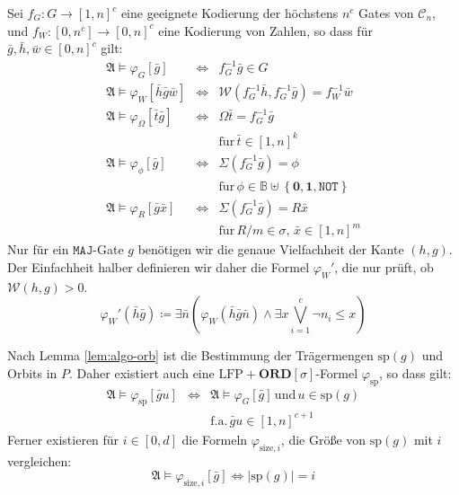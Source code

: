 Sei $f_{G}:G\rightarrow\left[1,n\right]^{c}$ eine geeignete Kodierung
der höchstens $n^{c}$ Gates von $\mathcal{C}_{n}$, und $f_{W}:\left[0,n^{c}\right]\rightarrow\left[0,n\right]^{c}$
eine Kodierung von Zahlen, so dass für $\bar{g},\bar{h},\bar{w}\in\left[0,n\right]^{c}$
gilt:
\begin{eqnarray*}
\mathfrak{A}\models\varphi_{G}\left[\bar{g}\right] & \Leftrightarrow & f_{G}^{-1}\bar{g}\in G\\
\mathfrak{A}\models\varphi_{W}\left[\bar{h}\bar{g}\bar{w}\right] & \Leftrightarrow & \mathcal{W}\left(f_{G}^{-1}\bar{h},f_{G}^{-1}\bar{g}\right)=f_{W}^{-1}\bar{w}\\
\mathfrak{A}\models\varphi_{\Omega}\left[\bar{t}\bar{g}\right] & \Leftrightarrow & \Omega\bar{t}=f_{G}^{-1}\bar{g}\\
 &  & \mathrm{f\ddot{u}r}\,\bar{t}\in\left[1,n\right]^{k}\\
\mathfrak{A}\models\varphi_{\phi}\left[\bar{g}\right] & \Leftrightarrow & \Sigma\left(f_{G}^{-1}\bar{g}\right)=\phi\\
 &  & \mathrm{f\ddot{u}r}\,\phi\in\mathbb{B}\uplus\left\{ \mathbf{0},\mathbf{1},\mathtt{NOT}\right\} \\
\mathfrak{A}\models\varphi_{R}\left[\bar{g}\bar{x}\right] & \Leftrightarrow & \Sigma\left(f_{G}^{-1}\bar{g}\right)=R\bar{x}\\
 &  & \mathrm{f\ddot{u}r}\,R/m\in\sigma,\,\bar{x}\in\left[1,n\right]^{m}
\end{eqnarray*}
Nur für ein $\mathtt{MAJ}$-Gate $g$ benötigen wir die genaue Vielfachheit
der Kante $\left(h,g\right)$. Der Einfachheit halber definieren wir
daher die Formel $\varphi_{W}'$, die nur prüft, ob $\mathcal{W}\left(h,g\right)>0$.
\[
\varphi_{W}'\left(\bar{h}\bar{g}\right)\coloneqq\exists\bar{n}\left(\varphi_{W}\left(\bar{h}\bar{g}\bar{n}\right)\wedge\exists x\bigvee_{i=1}^{c}\neg n_{i}\leqslant x\right)
\]

Nach Lemma \ref{lem:algo-orb} ist die Bestimmung der Trägermengen
$\mathrm{sp}\left(g\right)$ und Orbits in $P$. Daher existiert auch
eine $\mathrm{LFP}+\mathbf{ORD}\left[\sigma\right]$-Formel $\varphi_{\mathrm{sp}}$,
so dass gilt:
\begin{eqnarray*}
\mathfrak{A}\models\varphi_{\mathrm{sp}}\left[\bar{g}u\right] & \Leftrightarrow & \mathfrak{A}\models\varphi_{G}\left[\bar{g}\right]\,\mathrm{und}\,u\in\mathrm{sp}\left(g\right)\\
 &  & \mathrm{f.a.}\,\bar{g}u\in\left[1,n\right]^{c+1}
\end{eqnarray*}
Ferner existieren für $i\in\left[0,d\right]$ die Formeln $\varphi_{\mathrm{size},i}$,
die Größe von $\mathrm{sp}\left(g\right)$ mit $i$ vergleichen:
\[
\mathfrak{A}\models\varphi_{\mathrm{size},i}\left[\bar{g}\right]\Leftrightarrow\left|\mathrm{sp}\left(g\right)\right|=i
\]

